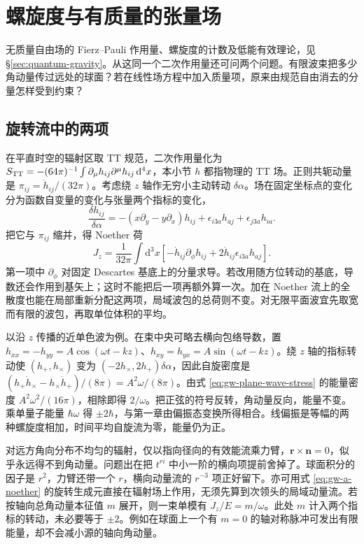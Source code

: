 \section{螺旋度与有质量的张量场}\label{sec:gw-a-field}

无质量自由场的 Fierz--Pauli 作用量、螺旋度的计数及低能有效理论，见 \S\ref{sec:quantum-gravity}。从这同一个二次作用量还可问两个问题。有限波束把多少角动量传过远处的球面？若在线性场方程中加入质量项，原来由规范自由消去的分量怎样受到约束？

\subsection{旋转流中的两项}

在平直时空的辐射区取 TT 规范，二次作用量化为 $S_{\rm TT}=-(64\pi)^{-1}\int \partial_\mu h_{ij}\partial^\mu h_{ij}\,\mathrm d^4x$，本小节 $h$ 都指物理的 TT 场。正则共轭动量是 $\pi_{ij}=\dot h_{ij}/(32\pi)$。考虑绕 $z$ 轴作无穷小主动转动 $\delta\alpha$。场在固定坐标点的变化分为函数自变量的变化与张量两个指标的变化，
\[
 \frac{\delta h_{ij}}{\delta\alpha}
 =-(x\partial_y-y\partial_x)h_{ij}
     +\epsilon_{i3a}h_{aj}+\epsilon_{j3a}h_{ia}.
\]
把它与 $\pi_{ij}$ 缩并，得 Noether 荷
\begin{equation}
 J_z=\frac{1}{32\pi}\int\mathrm d^3x
 \left[-\dot h_{ij}\partial_\phi h_{ij}
        +2\dot h_{ij}\epsilon_{i3a}h_{aj}\right].
 \label{eq:gw-a-noether}
\end{equation}
第一项中 $\partial_\phi$ 对固定 Descartes 基底上的分量求导。若改用随方位转动的基底，导数还会作用到基矢上；这时不能把后一项再额外算一次。加在 Noether 流上的全散度也能在局部重新分配这两项，局域波包的总荷则不变。对无限平面波宜先取宽而有限的波包，再取单位体积的平均。

以沿 $z$ 传播的近单色波为例。在束中央可略去横向包络导数，置 $h_{xx}=-h_{yy}=A\cos(\omega t-kz)$、$h_{xy}=h_{yx}=A\sin(\omega t-kz)$。绕 $z$ 轴的指标转动使 $(h_+,h_\times)$ 变为 $(-2h_\times,2h_+)\delta\alpha$，因此自旋密度是 $(h_+\dot h_\times-h_\times\dot h_+)/(8\pi)=A^2\omega/(8\pi)$。由式 \eqref{eq:gw-plane-wave-stress} 的能量密度 $A^2\omega^2/(16\pi)$，相除即得 $2/\omega$。把正弦的符号反转，角动量反向，能量不变。乘单量子能量 $\hbar\omega$ 得 $\pm2\hbar$，与第一章由偏振态变换所得相合。线偏振是等幅的两种螺旋度相加，时间平均自旋流为零，能量仍为正。

对远方角向分布不均匀的辐射，仅以指向径向的有效能流乘力臂，$\bm r\times\bm n=0$，似乎永远得不到角动量。问题出在把 $t^{ri}$ 中小一阶的横向项提前舍掉了。球面积分的因子是 $r^2$，力臂还带一个 $r$，横向动量流的 $r^{-3}$ 项正好留下。亦可用式 \eqref{eq:gw-a-noether} 的旋转生成元直接在辐射场上作用，无须先算到次领头的局域动量流。若按轴向总角动量本征值 $m$ 展开，则一束单模有 $\dot J_z/\dot E=m/\omega$。此处 $m$ 计入两个指标的转动，未必要等于 $\pm2$。例如在球面上一个有 $m=0$ 的轴对称脉冲可发出有限能量，却不会减小源的轴向角动量。

